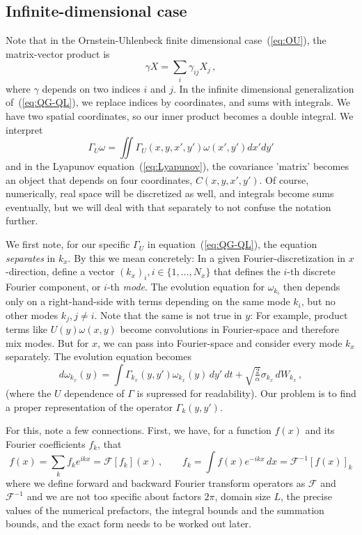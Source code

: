 \documentclass[11pt,reqno,a4paper]{amsart}
\theoremstyle{definition}
\begin{document}
\subsection{Infinite-dimensional case}

Note that in the Ornstein-Uhlenbeck finite dimensional
case~(\ref{eq:OU}), the matrix-vector product is
\begin{equation}
  \label{eq:matrix-vector}
  \gamma X = \sum_i \gamma_{ij} X_j\,,
\end{equation}
where $\gamma$ depends on two indices $i$ and $j$. In the infinite
dimensional generalization of~(\ref{eq:QG-QL}), we replace indices by
coordinates, and sums with integrals. We have two spatial coordinates,
so our inner product becomes a double integral. We interpret
\begin{equation}
  \Gamma_U \omega = \iint \Gamma_U(x,y,x',y') \omega(x',y') dx' dy'
\end{equation}
and in the Lyapunov equation~(\ref{eq:Lyapunov}), the covariance
'matrix' becomes an object that depends on four coordinates,
$C(x,y,x',y')$. Of course, numerically, real space will be discretized
as well, and integrals become sums eventually, but we will deal with
that separately to not confuse the notation further.

We first note, for our specific $\Gamma_U$ in
equation~(\ref{eq:QG-QL}), the equation \emph{separates} in $k_x$. By
this we mean concretely: In a given Fourier-discretization in
$x$-direction, define a vector $(k_x)_i, i\in\{1,\dots,N_x\}$ that
defines the $i$-th discrete Fourier component, or $i$-th
\emph{mode}. The evolution equation for $\omega_{k_i}$ then depends
only on a right-hand-side with terms depending on the same mode $k_i$,
but no other modes $k_j, j\ne i$. Note that the same is not true in
$y$: For example, product terms like $U(y) \omega(x,y)$ become
convolutions in Fourier-space and therefore mix modes. But for $x$, we
can pass into Fourier-space and consider every mode $k_x$
separately. The evolution equation becomes
\begin{equation}
  d\omega_{k_x}(y) = \int \Gamma_{k_x}(y,y') \omega_{k_x}(y)\,dy'\ dt + \sqrt{\tfrac2\alpha}\sigma_{k_x} \,dW_{k_x}\,,
\end{equation}
(where the $U$ dependence of $\Gamma$ is supressed for
readability). Our problem is to find a proper representation of the
operator $\Gamma_k(y,y')$.

For this, note a few connections. First, we have, for a function
$f(x)$ and its Fourier coefficients $f_k$, that
\begin{equation}
  f(x) = \sum_k f_k e^{ikx} = \mathcal F[f_k](x)\,,\qquad f_k = \int f(x) e^{-ikx}\,dx = \mathcal F^{-1}[f(x)]_k
\end{equation}
where we define forward and backward Fourier transform operators as
$\mathcal F$ and $\mathcal F^{-1}$ and we are not too specific about
factors $2\pi$, domain size $L$, the precise values of the numerical
prefactors, the integral bounds and the summation bounds, and the
exact form needs to be worked out later.
\end{document}
